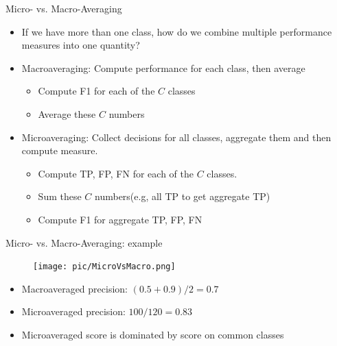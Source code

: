 \documentclass[serif, aspectratio=169]{beamer}
\begin{document}
\begin{frame}{Micro- vs. Macro-Averaging}
    \begin{itemize}
        \item If we have more than one class, how do we combine
multiple performance measures into one quantity?
        \item \textcolor{deepred}{Macroaveraging}: Compute performance for each class, then average
        \begin{itemize}
            \item Compute F1 for each of the $C$ classes
            \item Average these $C$ numbers
        \end{itemize}
        \item \textcolor{deepred}{Microaveraging}: Collect decisions for all classes, aggregate them and then compute measure.
        \begin{itemize}
            \item Compute TP, FP, FN for each of the $C$ classes.
            \item Sum these $C$ numbers(e.g, all TP to get aggregate TP)
            \item Compute F1 for aggregate TP, FP, FN
        \end{itemize}
    \end{itemize}
\end{frame}
\begin{frame}{Micro- vs. Macro-Averaging: example}
    \begin{figure}[h]
            \centering
            
            \texttt{[image: pic/MicroVsMacro.png]}
            \end{figure}
            
    \begin{itemize}
        \item Macroaveraged precision: $(0.5 + 0.9)/2 = 0.7$
        \item Microaveraged precision: $100/120 = 0.83$
        \item Microaveraged score is dominated by score on common classes
    \end{itemize}
\end{frame}
\end{document}
